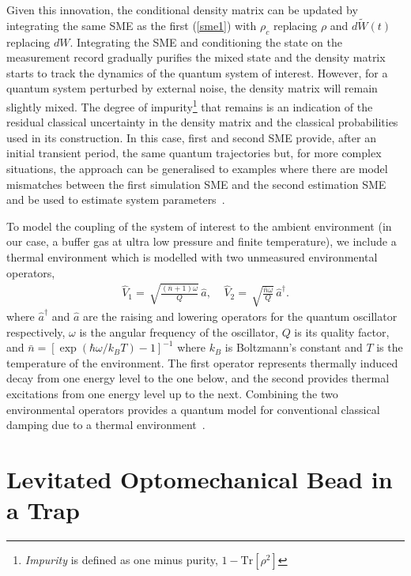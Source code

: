 \documentclass[conference]{IEEEtran}
\begin{document}
Given this innovation, the conditional density matrix can be updated by integrating the same SME as the first (\ref{sme1}) with $\rho_c$ replacing $\rho$ and $d\tilde{W}(t)$ replacing $dW$. Integrating the SME and conditioning the state on the measurement record gradually purifies the mixed state and the density matrix starts to track the dynamics of the quantum system of interest. However, for a quantum system perturbed by external noise, the density matrix will remain slightly mixed. The degree of impurity\footnote{{\it Impurity} is defined as one minus purity, $1-\mathrm{Tr}[\rho^2]$} that remains is an indication of the residual classical uncertainty in the density matrix and the classical probabilities used in its construction. In this case, first and second SME provide, after an initial transient period, the same quantum trajectories but, for more complex situations, the approach can be generalised to examples where there are model mismatches between the first simulation SME and the second estimation SME and be used to estimate system parameters~\cite{Ral2017}.

To model the coupling of the system of interest to the ambient environment (in our case, a buffer gas at ultra low pressure and finite temperature), we include a thermal environment which is modelled with two unmeasured environmental operators, 
\begin{eqnarray}\label{thermalOps}
\hat{V}_1 = \, \sqrt{\frac{(\bar{n}+1)\omega}{Q}} \, \hat{a} ,  \;\;\;\;  \hat{V}_2  = \, \sqrt{\frac{\bar{n}\omega}{Q}} \, \hat{a}^{\dagger} . 
\end{eqnarray}
where $\hat{a}^{\dagger}$ and $\hat{a}$ are the raising and lowering operators for the quantum oscillator respectively, $\omega$ is the angular frequency of the oscillator, $Q$ is its quality factor, and \mbox{$\bar{n} = [\exp(\hbar\omega/k_{B} T) - 1]^{-1}$} where $k_{B}$ is Boltzmann's constant and $T$ is the temperature of the environment. The first operator represents thermally induced decay from one energy level to the one below, and the second provides thermal excitations from one energy level up to the next. Combining the two environmental operators provides a quantum model for conventional classical damping due to a thermal environment~\cite{Spi1993}.  

\section{Levitated Optomechanical Bead in a Trap}\label{model}
\end{document}

